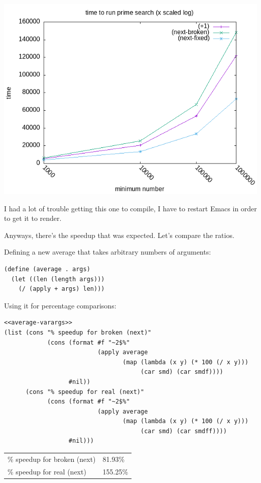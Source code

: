 \documentclass[final,fleqn,titlepage,twoside]{article}
\begin{document}
\begin{center}
\includegraphics[width=.9\linewidth]{1/fig/1-22-3.png}
\end{center}

I had a lot of trouble getting this one to compile, I have to restart Emacs in
order to get it to render.

Anyways, there's the speedup that was expected. Let's compare the ratios.

Defining a new average that takes arbitrary numbers of arguments:
\begin{verbatim}
(define (average . args)
  (let ((len (length args)))
    (/ (apply + args) len)))
\end{verbatim}

Using it for percentage comparisons:
\begin{verbatim}
<<average-varargs>>
(list (cons "% speedup for broken (next)"
            (cons (format #f "~2$%"
                          (apply average
                                 (map (lambda (x y) (* 100 (/ x y)))
                                      (car smd) (car smdf))))
                  #nil))
      (cons "% speedup for real (next)"
            (cons (format #f "~2$%"
                          (apply average
                                 (map (lambda (x y) (* 100 (/ x y)))
                                      (car smd) (car smdff))))
                  #nil)))
\end{verbatim}

\begin{center}
\begin{tabular}{ll}
\% speedup for broken (next) & 81.93\%\\[0pt]
\% speedup for real (next) & 155.25\%\\[0pt]
\end{tabular}
\end{center}
\end{document}
